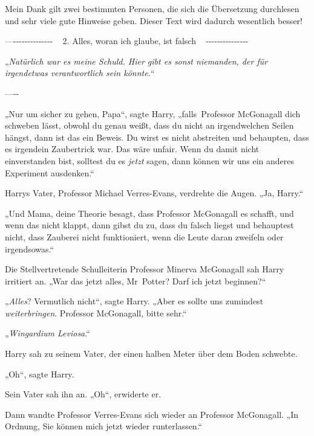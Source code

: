 

\hypertarget{alles-woran-ich-glaube-ist-falsch}{%

Mein Dank gilt zwei bestimmten Personen, die sich die Übersetzung durchlesen und sehr viele gute Hinweise geben. Dieser Text wird dadurch wesentlich besser!

—\/-\/-\/-\/-\/-\/-\/-\/-\/-\/-\/-\/-\/-\/- ~ 2. Alles, woran ich glaube, ist falsch ~ -\/-\/-\/-\/-\/-\/-\/-\/-\/-\/-\/-\/-\/-\/-

„\emph{Natürlich war es meine Schuld. Hier gibt es sonst niemanden, der für irgendetwas verantwortlich sein könnte.}“

—\/-\/-

„Nur um sicher zu gehen, Papa“, sagte Harry, „falls~Professor McGonagall dich schweben lässt, obwohl du genau weißt, dass du nicht an irgendwelchen Seilen hängst, dann ist das ein Beweis. Du wirst es nicht abstreiten und behaupten, dass es irgendein Zaubertrick war. Das wäre unfair. Wenn du damit nicht einverstanden bist, solltest du es \emph{jetzt} sagen, dann können wir uns ein anderes Experiment ausdenken.“

Harrys Vater, Professor Michael Verres-Evans, verdrehte die Augen. „Ja, Harry.“

„Und Mama, deine Theorie besagt, dass Professor McGonagall es schafft, und wenn das nicht klappt, dann gibst du zu, dass du falsch liegst und behauptest nicht, dass Zauberei nicht funktioniert, wenn die Leute daran zweifeln oder irgendsowas.“

Die Stellvertretende Schulleiterin Professor Minerva McGonagall sah Harry irritiert an. „War das jetzt alles, Mr~Potter? Darf ich jetzt beginnen?“

„\emph{Alles}? Vermutlich nicht“, sagte Harry. „Aber es sollte uns zumindest \emph{weiterbringen}. Professor McGonagall, bitte sehr.“

„\emph{Wingardium Leviosa}.“

Harry sah zu seinem Vater, der einen halben Meter über dem Boden schwebte.

„Oh“, sagte Harry.

Sein Vater sah ihn an. „Oh“, erwiderte er.

Dann wandte Professor Verres-Evans sich wieder an Professor McGonagall. „In Ordnung, Sie können mich jetzt wieder runterlassen.“

}

